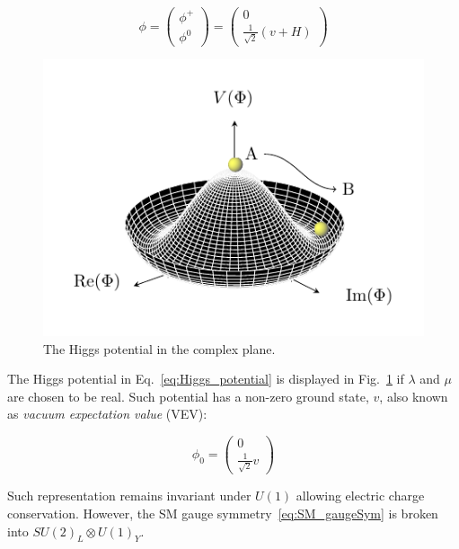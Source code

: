 			\begin{equation}
			\label{eq:Higgs_doublet}
				\phi = 
				\begin{pmatrix}
					\phi^+ \\ \phi^0
				\end{pmatrix} 
				=
				\begin{pmatrix}
					0 \\ \frac{1}{\sqrt{2}} \left ( v + H \right )
				\end{pmatrix}
			\end{equation}

			\begin{figure}[!htb]
				\centering
				\includegraphics[width=.5\textwidth]{HiggsPotential/HiggsPotential}
			\caption{\label{fig:higgs_potential}The Higgs potential in the complex plane.} %
			\end{figure}

			The Higgs potential in Eq.~\ref{eq:Higgs_potential} is displayed in Fig.~\ref{fig:higgs_potential} if $\lambda$ and $\mu$ are chosen to be real. Such potential has a non-zero ground state, $v$, also known as \emph{vacuum expectation value} (VEV):

			\begin{equation}
			\label{eq:Higgs_vev}
				\phi_0 = 
				\begin{pmatrix}
					0 \\ \frac{1}{\sqrt{2}} v
				\end{pmatrix}
			\end{equation}

			\noindent Such representation remains invariant under $U(1)$ allowing electric charge conservation. However, the SM gauge symmetry~\ref{eq:SM_gaugeSym} is broken into $SU(2)_L \otimes U(1)_Y$.

